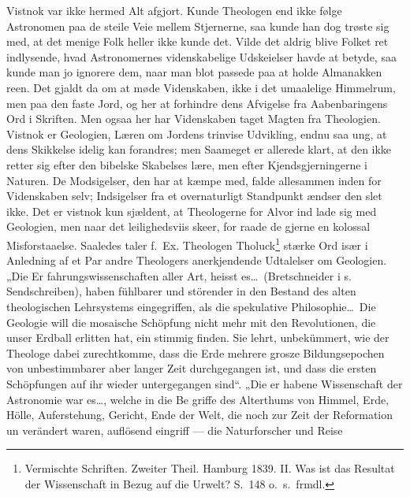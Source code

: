 \documentclass[12pt,a4paper]{article}
\newcommand{\opage}[1]{\marginnote{\footnotesize\textit{[#1]}}}
\begin{document}
Vistnok var ikke hermed Alt afgjort. Kunde Theologen end
ikke følge Astronomen paa de steile Veie mellem Stjernerne, saa
kunde han dog trøste sig med, at det menige Folk heller ikke
kunde det. Vilde det aldrig blive Folket ret indlysende, hvad
Astronomernes videnskabelige Udskeielser havde at betyde, saa
kunde man jo ignorere dem, naar man blot passede paa at holde
Almanakken reen. Det gjaldt da om at møde Videnskaben, ikke
i det umaalelige Himmelrum, men paa den faste Jord, og her at
forhindre dens Afvigelse fra Aabenbaringens Ord i Skriften. Men
ogsaa her har Videnskaben taget Magten fra Theologien. Vistnok
er Geologien, Læren om Jordens trinvise Udvikling, endnu saa
ung, at dens Skikkelse idelig kan forandres; men Saameget er
allerede klart, at den ikke retter sig efter den bibelske Skabelses\-%
lære, men efter Kjendsgjerningerne i Naturen. De Modsigelser,
den har at kæmpe med, falde allesammen inden for Videnskaben
selv; Indsigelser fra et overnaturligt Standpunkt ændser den slet
ikke. Det er vistnok kun sjældent, at Theologerne for Alvor ind\-%
lade sig med Geologien, men naar det leilighedsviis skeer, for\-%
raade de gjerne en kolossal Misforstaaelse. Saaledes taler f.\ Ex.
Theologen Tholuck\footnote{Vermischte Schriften. Zweiter Theil. Hamburg 1839. II. Was ist
das Resultat der Wissenschaft in Bezug auf die Urwelt? S.\ 148
o.\ s.\ frmdl.} %
stærke Ord især i Anledning af et Par andre
Theologers anerkjendende Udtalelser om Geologien. „Die Er\-%
fahrungswissenschaften aller Art, heisst es\ldots\ (Bretschneider i s.
Sendschreiben), haben fühlbarer und störender in den Bestand des
\opage{36}alten theologischen Lehrsystems eingegriffen, als die spekulative
Philosophie\ldots\ Die Geologie will die mosaische Schöpfung nicht
mehr mit den Revolutionen, die unser Erdball erlitten hat, ein\-%
stimmig finden. Sie lehrt, unbekümmert, wie der Theologe dabei
zurechtkomme, dass die Erde mehrere grosze Bildungsepochen von
unbestimmbarer aber langer Zeit durchgegangen ist, und dass die
ersten Schöpfungen auf ihr wieder untergegangen sind“. „Die er\-%
habene Wissenschaft der Astronomie war es\ldots, welche in die Be\-%
griffe des Alterthums von Himmel, Erde, Hölle, Auferstehung,
Gericht, Ende der Welt, die noch zur Zeit der Reformation un\-%
verändert waren, auflösend eingriff --- die Naturforscher und Reise\-%
\end{document}
